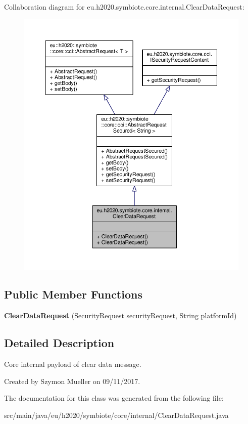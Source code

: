 Collaboration diagram for eu.\+h2020.\+symbiote.\+core.\+internal.\+Clear\+Data\+Request\+:
\nopagebreak
\begin{figure}[H]
\begin{center}
\leavevmode
\includegraphics[width=350pt]{classeu_1_1h2020_1_1symbiote_1_1core_1_1internal_1_1ClearDataRequest__coll__graph}
\end{center}
\end{figure}
\subsection*{Public Member Functions}
\begin{DoxyCompactItemize}
\item 
\mbox{\label{classeu_1_1h2020_1_1symbiote_1_1core_1_1internal_1_1ClearDataRequest_af1e80857778911f88707127a548d29d0}} 
{\bfseries Clear\+Data\+Request} (Security\+Request security\+Request, String platform\+Id)
\end{DoxyCompactItemize}


\subsection{Detailed Description}
Core internal payload of clear data message.

Created by Szymon Mueller on 09/11/2017. 

The documentation for this class was generated from the following file\+:\begin{DoxyCompactItemize}
\item 
src/main/java/eu/h2020/symbiote/core/internal/Clear\+Data\+Request.\+java\end{DoxyCompactItemize}
